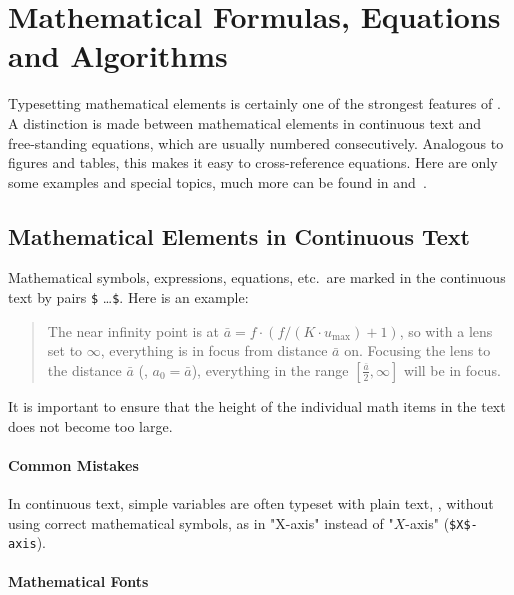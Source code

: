 \chapter[Mathematical Formulas etc.]{Mathematical Formulas, Equations and Algorithms}
\label{cha:Mathematics}


Typesetting mathematical elements is certainly one of the strongest features of
\latex. A distinction is made between mathematical elements in continuous text
and free-standing equations, which are usually numbered consecutively.
Analogous to figures and tables, this makes it easy to cross-reference equations.
Here are only some examples and special topics, much more can be found in 
\cite[Ch.\ 7]{Kopka2003} and~\cite{Voss2014}.


\section{Mathematical Elements in Continuous Text}

Mathematical symbols, expressions, equations, etc.\ are marked in the continuous
text by pairs \verb!$! \ldots \verb!$!. Here is an example:
%
\begin{quote}
	The near infinity point is at $\bar{a} = f \cdot (f / (K \cdot u_{\max}) + 1)$, 
	so with a lens set to $\infty$, everything is in focus from distance $\bar{a}$ on.
	Focusing the lens to the distance $\bar{a}$ (\ie, $a_0 = \bar{a}$), everything
	in the range $[\frac{\bar{a}}{2}, \infty]$ will be in focus.
\end{quote}
%
It is important to ensure that the height of the individual math items in the text
does not become too large.

\subsubsection{Common Mistakes}

In continuous text, simple variables are often typeset with plain text,
\ie, without using correct mathematical symbols, as in "X-axis" instead of 
"$X$-axis" (\verb!$X$-axis!).


\subsubsection{Mathematical Fonts}

